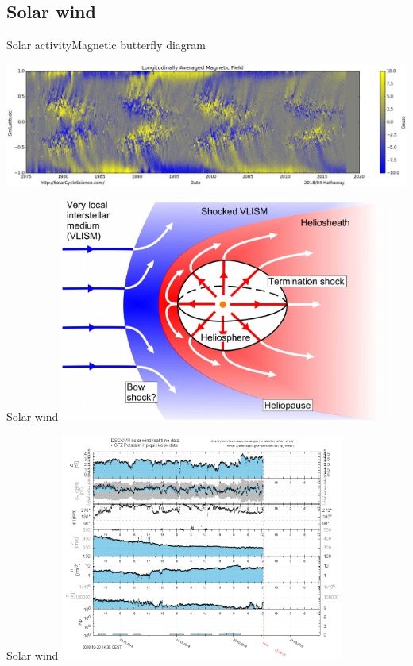 \subsection{Solar wind}

\begin{frame}[c,label=butterfly]{Solar activity}{Magnetic butterfly diagram}
	
	\centering
	\includegraphics[width=\textwidth]{../figures_of_others/images/Hathaway_magbfly_201804_cropped.png}
\end{frame}
\begin{frame}[plain,c]{Solar wind}{}
	\centering
	\includegraphics[width=0.8\textwidth]{../figures_of_others/images/Owens2013_Heliosphere_screenshot.png}
\end{frame}
\begin{frame}[plain,c]{Solar wind}{}
	\centering
	\includegraphics[width=0.7\textwidth]{../talk_figures/ace_realtime_ap_plot.png}
\end{frame}
